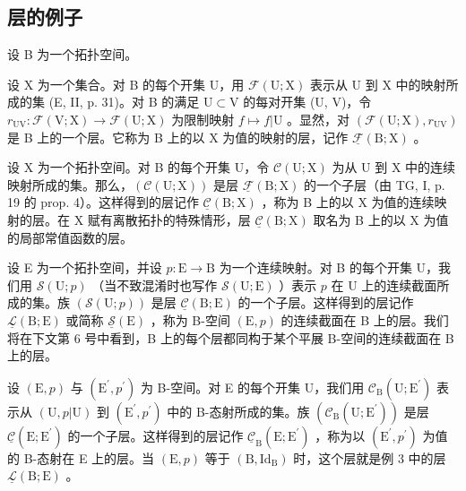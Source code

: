 \subsection{层的例子}

设 B 为一个拓扑空间。


设 X 为一个集合。对 B 的每个开集 U，用 \(\mathcal{F}(\mathrm{U};\mathrm{X})\) 表示从 U 到 X 中的映射所成的集 (E, II, p. 31)。对 B 的满足 \(\mathrm{U}\subset \mathrm{V}\) 的每对开集 (U, V)，令 \(r_{\mathrm{UV}}\colon \mathcal{F}(\mathrm{V};\mathrm{X})\to\mathcal{F}(\mathrm{U};\mathrm{X})\) 为限制映射 \(f\mapsto f|\mathrm{U}\) 。显然，对 \((\mathcal{F}(\mathrm{U};\mathrm{X}),r_{\mathrm{UV}})\) 是 B 上的一个层。它称为 B 上的以 X 为值的映射的层，记作 \(\underline{\mathcal{F}} (\mathrm{B};\mathrm{X})\) 。


设 X 为一个拓扑空间。对 B 的每个开集 U，令 \(\mathcal{C}(\mathrm{U};\mathrm{X})\) 为从 U 到 X 中的连续映射所成的集。那么，\((\mathcal{C}(\mathrm{U};\mathrm{X}))\) 是层 \(\underline{\mathcal{F}} (\mathrm{B};\mathrm{X})\) 的一个子层（由 TG, I, p. 19 的 prop. 4）。这样得到的层记作 \(\underline{\mathcal{C}} (\mathrm{B};\mathrm{X})\) ，称为 B 上的以 X 为值的连续映射的层。在 X 赋有离散拓扑的特殊情形，层 \(\underline{\mathcal{C}} (\mathrm{B};\mathrm{X})\) 取名为 B 上的以 X 为值的局部常值函数的层。


设 E 为一个拓扑空间，并设 \(p \colon \mathrm{E} \to \mathrm{B}\) 为一个连续映射。对 B 的每个开集 U，我们用 \(\mathcal{S}(\mathrm{U};p)\) （当不致混淆时也写作 \(\mathcal{S}(\mathrm{U};\mathrm{E})\) ）表示 \(p\) 在 U 上的连续截面所成的集。族 \((\mathcal{S}(\mathrm{U};p))\) 是层 \(\underline{\mathcal{C}}(\mathrm{B};\mathrm{E})\) 的一个子层。这样得到的层记作 \(\underline{\mathcal{L}}(\mathrm{B};\mathrm{E})\) 或简称 \(\underline{\mathcal{S}}(\mathrm{E})\) ，称为 B-空间 \((\mathrm{E},p)\) 的连续截面在 B 上的层。我们将在下文第 6 号中看到，B 上的每个层都同构于某个平展 B-空间的连续截面在 B 上的层。


设 \((\mathrm{E},p)\) 与 \((\mathrm{E}^{\prime},p^{\prime})\) 为 B-空间。对 E 的每个开集 U，我们用 \(\mathcal{C}_{\mathrm{B}}(\mathrm{U};\mathrm{E}^{\prime})\) 表示从 \((\mathrm{U},p|\mathrm{U})\) 到 \((\mathrm{E}^{\prime},p^{\prime})\) 中的 B-态射所成的集。族 \((\mathcal{C}_{\mathrm{B}}(\mathrm{U};\mathrm{E}^{\prime}))\) 是层 \(\underline{\mathcal{C}}(\mathrm{E};\mathrm{E}^{\prime})\) 的一个子层。这样得到的层记作 \(\underline{\mathcal{C}}_{\mathrm{B}}(\mathrm{E};\mathrm{E}^{\prime})\) ，称为以 \((\mathrm{E}^{\prime},p^{\prime})\) 为值的 B-态射在 E 上的层。当 \((\mathrm{E},p)\) 等于 \((\mathrm{B},\mathrm{Id}_{\mathrm{B}})\) 时，这个层就是例 3 中的层 \(\underline{\mathcal{L}}(\mathrm{B};\mathrm{E})\) 。

